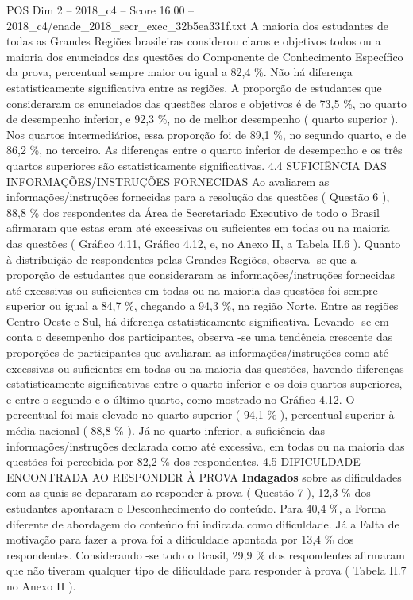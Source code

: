 \begin{textsample}{POS Dim 2 – 2018\_c4 – Score 16.00 – 2018\_c4/enade\_2018\_secr\_exec\_32b5ea331f.txt}
A maioria dos estudantes de todas as Grandes Regiões brasileiras considerou claros e objetivos todos ou a maioria dos enunciados das questões do Componente de Conhecimento Específico da prova, percentual sempre maior ou igual a 82,4 \%.
Não há diferença estatisticamente significativa entre as regiões.
A proporção de estudantes que consideraram os enunciados das questões claros e objetivos é de 73,5 \%, no quarto de desempenho inferior, e 92,3 \%, no de melhor desempenho ( quarto superior ).
Nos quartos intermediários, essa proporção foi de 89,1 \%, no segundo quarto, e de 86,2 \%, no terceiro.
As diferenças entre o quarto inferior de desempenho e os três quartos superiores são estatisticamente significativas. 4.4 SUFICIÊNCIA DAS INFORMAÇÕES/INSTRUÇÕES FORNECIDAS Ao avaliarem as informações/instruções fornecidas para a resolução das questões ( Questão 6 ), 88,8 \% dos respondentes da Área de Secretariado Executivo de todo o Brasil afirmaram que estas eram até excessivas ou suficientes em todas ou na maioria das questões ( Gráfico 4.11, Gráfico 4.12, e, no Anexo II, a Tabela II.6 ).
Quanto à distribuição de respondentes pelas Grandes Regiões, observa -se que a proporção de estudantes que consideraram as informações/instruções fornecidas até excessivas ou suficientes em todas ou na maioria das questões foi sempre superior ou igual a 84,7 \%, chegando a 94,3 \%, na região Norte.
Entre as regiões Centro-Oeste e Sul, há diferença estatisticamente significativa.
Levando -se em conta o desempenho dos participantes, observa -se uma tendência crescente das proporções de participantes que avaliaram as informações/instruções como até excessivas ou suficientes em todas ou na maioria das questões, havendo diferenças estatisticamente significativas entre o quarto inferior e os dois quartos superiores, e entre o segundo e o último quarto, como mostrado no Gráfico 4.12.
O percentual foi mais elevado no quarto superior ( 94,1 \% ), percentual superior à média nacional ( 88,8 \% ).
Já no quarto inferior, a suficiência das informações/instruções declarada como até excessiva, em todas ou na maioria das questões foi percebida por 82,2 \% dos respondentes. 4.5 DIFICULDADE ENCONTRADA AO RESPONDER À PROVA \textbf{Indagados} sobre as dificuldades com as quais se depararam ao responder à prova ( Questão 7 ), 12,3 \% dos estudantes apontaram o Desconhecimento do conteúdo.
Para 40,4 \%, a Forma diferente de abordagem do conteúdo foi indicada como dificuldade.
Já a Falta de motivação para fazer a prova foi a dificuldade apontada por 13,4 \% dos respondentes.
Considerando -se todo o Brasil, 29,9 \% dos respondentes afirmaram que não tiveram qualquer tipo de dificuldade para responder à prova ( Tabela II.7 no Anexo II ).

\end{textsample}
